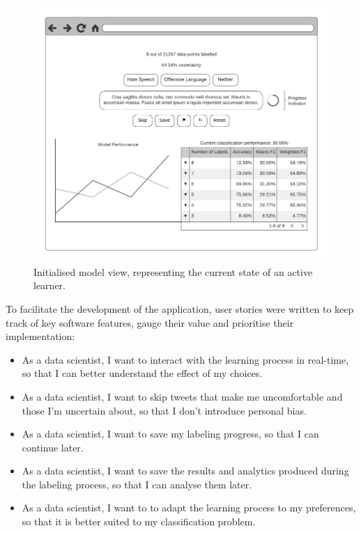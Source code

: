 \documentclass[a4paper,12pt]{article}
\begin{document}
\begin{figure}[H]
\centering
    \includegraphics[scale=0.90]{model_wireframe.pdf}
\captionsetup{justification=centering}
\caption{\label{fig:modelview}Initialised model view, representing the current state of an active learner.}
\end{figure}
To facilitate the development of the application, user stories were written to keep track of key software features, gauge their value and prioritise their implementation:\label{subsection:stories}
\begin{itemize}
    \item As a data scientist, I want to interact with the learning process in real-time, so that I can better understand the effect of my choices.
    \item As a data scientist, I want to skip tweets that make me uncomfortable and those I'm uncertain about, so that I don't introduce personal bias.
    \item As a data scientist, I want to save my labeling progress, so that I can continue later.
    \item As a data scientist, I want to save the results and analytics produced during the labeling process, so that I can analyse them later.
    \item As a data scientist, I want to to adapt the learning process to my preferences, so that it is better suited to my classification problem.
\end{itemize}   
\end{document}
